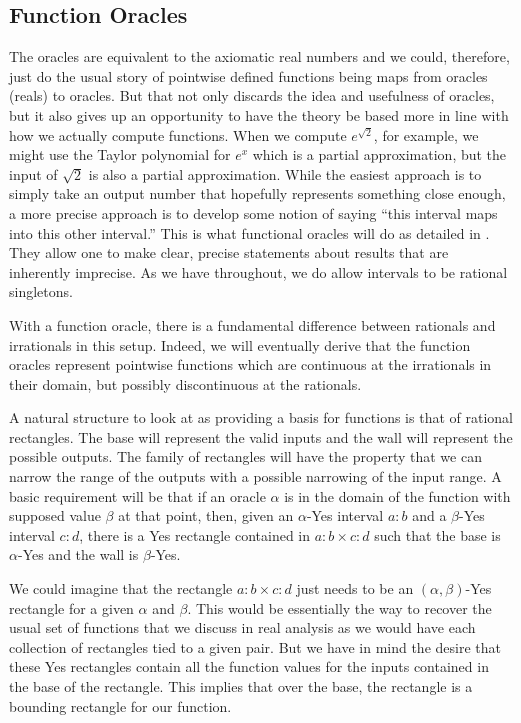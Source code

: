\documentclass[12pt]{article}
\begin{document}
\subsection{Function Oracles}

The oracles are equivalent to the axiomatic real numbers and we could, therefore, just do the usual story of pointwise defined functions being maps from oracles (reals) to oracles. But that not only discards the idea and usefulness of oracles, but it also gives up an opportunity to have the theory be based more in line with how we actually compute functions. When we compute $e^{\sqrt{2}}$, for example, we might use the Taylor polynomial for $e^x$ which is a partial approximation, but the input of $\sqrt{2}$ is also a partial approximation. While the easiest approach is to simply take an output number that hopefully represents something close enough, a more precise approach is to develop some notion of saying ``this interval maps into this other interval.'' This is what functional oracles will do as detailed in \cite{taylor23funora}. They allow one to make clear, precise statements about results that are inherently imprecise. As we have throughout, we do allow intervals to be rational singletons. 

With a function oracle, there is a fundamental difference between rationals and irrationals in this setup. Indeed, we will eventually derive that the function oracles represent pointwise functions which are continuous at the irrationals in their domain, but possibly discontinuous at the rationals.

A natural structure to look at as providing a basis for functions is that of rational rectangles. The base will represent the valid inputs and the wall will represent the possible outputs. The family of rectangles will have the property that we can narrow the range of the outputs with a possible narrowing of the input range. A basic requirement will be that if an oracle $\alpha$ is in the domain of the function with supposed value $\beta$ at that point, then, given an $\alpha$-Yes interval $a:b$ and a $\beta$-Yes interval $c:d$, there is a Yes rectangle contained in $a:b \times c:d$ such that the base is $\alpha$-Yes and the wall is $\beta$-Yes. 

We could imagine that the rectangle $a:b \times c:d$ just needs to be an $(\alpha, \beta)$-Yes rectangle for a given $\alpha$ and $\beta$. This would be essentially the way to recover the usual set of functions that we discuss in real analysis as we would have each collection of rectangles tied to a given pair. But we have in mind the desire that these Yes rectangles contain all the function values for the inputs contained in the base of the rectangle. This implies that over the base, the rectangle is a bounding rectangle for our function. 
\end{document}
